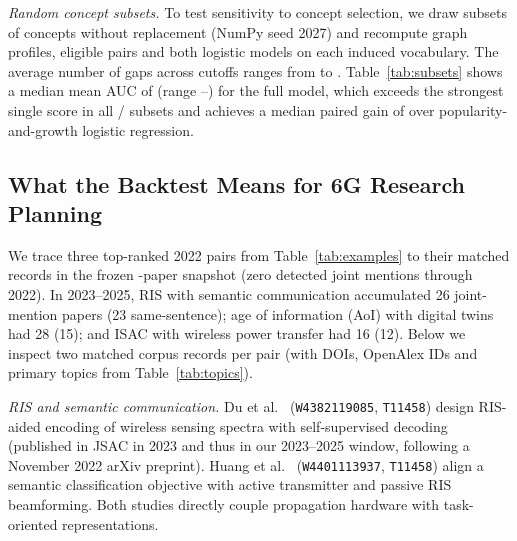 \documentclass[runningheads]{llncs}
\begin{document}
\emph{Random concept subsets.} To test sensitivity to concept selection, we draw \subN{} subsets of \subK{} concepts without replacement (NumPy seed 2027) and recompute graph profiles, eligible pairs and both logistic models on each induced vocabulary. The average number of gaps across cutoffs ranges from \subGapMin{} to \subGapMax{}. Table~\ref{tab:subsets} shows a median mean AUC of \subLearnedMed{} (range \subLearnedMin{}--\subLearnedMax{}) for the full model, which exceeds the strongest single score in all \subWins{}/\subN{} subsets and achieves a median paired gain of \subLrpgGainMed{} over popularity-and-growth logistic regression.

\begin{table}[t]
\centering
\caption{Gaps open at the end of \fcT{} with the highest and lowest closure scores $\hat p$ for 2026--2028 (trained on cutoffs through 2022, using publications up to 2025; scores are uncalibrated, see Section~\ref{sec:calib}).}
\label{tab:forecast}
\scriptsize
\setlength{\tabcolsep}{3pt}
\resizebox{\textwidth}{!}{}
\end{table}

\subsection{What the Backtest Means for 6G Research Planning}

We trace three top-ranked 2022 pairs from Table~\ref{tab:examples} to their matched records in the frozen \nWorks{}-paper snapshot (zero detected joint mentions through 2022). In 2023--2025, RIS with semantic communication accumulated 26 joint-mention papers (23 same-sentence); age of information (AoI) with digital twins had 28 (15); and ISAC with wireless power transfer had 16 (12). Below we inspect two matched corpus records per pair (with DOIs, OpenAlex IDs and primary topics from Table~\ref{tab:topics}).

\emph{RIS and semantic communication.} Du et al.~\cite{du2023sensing} (\texttt{W4382119085}, \texttt{T11458}) design RIS-aided encoding of wireless sensing spectra with self-supervised decoding (published in JSAC in 2023 and thus in our 2023--2025 window, following a November 2022 arXiv preprint). Huang et al.~\cite{huang2024beamforming} (\texttt{W4401113937}, \texttt{T11458}) align a semantic classification objective with active transmitter and passive RIS beamforming. Both studies directly couple propagation hardware with task-oriented representations.
\end{document}
